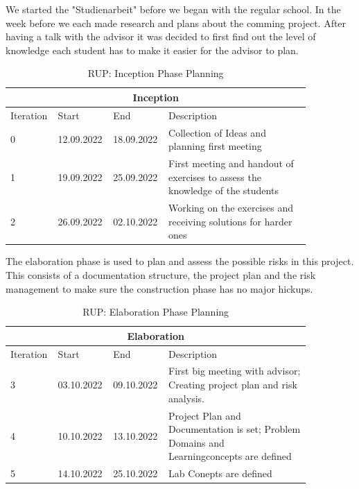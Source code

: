 \noindent We started the "Studienarbeit" before we began with the regular school. In the week before we each made research and plans about the comming project. After having a talk with the advisor it was decided to first find out the level of knowledge each student has to make it easier for the advisor to plan.
\begin{table}[H]
    \centering
    \begin{tabular}{|p{0.1\linewidth}|p{0.15\linewidth}|p{0.15\linewidth}|p{0.46\linewidth}|}
        \hline
        \multicolumn{4}{||c||}{\textbf{Inception}} \\
        \hline \hline
        Iteration & Start & End & Description \\
        \hline \hline
        0 & 12.09.2022 & 18.09.2022 & Collection of Ideas and planning first meeting\\
        \hline
        1 & 19.09.2022 & 25.09.2022 & First meeting and handout of exercises to assess the knowledge of the students \\
        \hline
        2 & 26.09.2022 & 02.10.2022 & Working on the exercises and receiving solutions for harder ones \\
        \hline
    \end{tabular}
    \caption{RUP: Inception Phase Planning}
    \label{inception_table}
\end{table}

\noindent The elaboration phase is used to plan and assess the possible risks in this project. This consists of a documentation structure, the project plan and the risk management to make sure the construction phase has no major hickups.
\begin{table}[H]
    \centering
    \begin{tabular}{|p{0.1\linewidth}|p{0.15\linewidth}|p{0.15\linewidth}|p{0.46\linewidth}|}
        \hline
        \multicolumn{4}{||c||}{\textbf{Elaboration}} \\
        \hline \hline
        Iteration & Start & End & Description \\
        \hline \hline
        3 & 03.10.2022 & 09.10.2022 &  First big meeting with advisor; Creating project plan and risk analysis.\\
        \hline
        4 & 10.10.2022 & 13.10.2022 & Project Plan and Documentation is set; Problem Domains and Learningconcepts are defined \\
        \hline
        5 & 14.10.2022 & 25.10.2022 & Lab Conepts are defined \\
        \hline
    \end{tabular}
    \caption{RUP: Elaboration Phase Planning}
    \label{elaboration_table}
\end{table}

